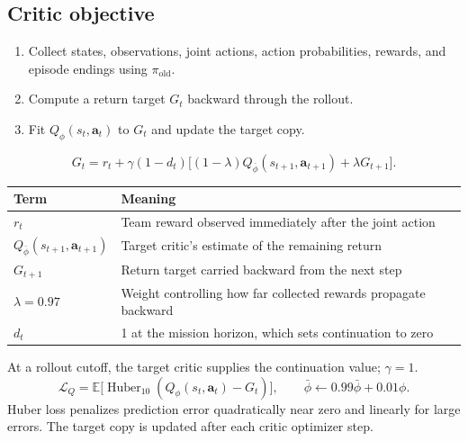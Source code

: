\documentclass[11pt,a4paper]{article}
\newcommand{\E}{\mathbb E}
\begin{document}
\subsection{Critic objective}
\begin{enumerate}
\item Collect states, observations, joint actions, action probabilities, rewards, and episode endings using $\pi_{\mathrm{old}}$.
\item Compute a return target $G_t$ backward through the rollout.
\item Fit $Q_\phi(s_t,\boldsymbol a_t)$ to $G_t$ and update the target copy.
\end{enumerate}
\[
G_t=r_t+\gamma(1-d_t)
\bigl[(1-\lambda)Q_{\bar\phi}(s_{t+1},\boldsymbol a_{t+1})+\lambda G_{t+1}\bigr].
\]
\begin{center}
\begin{tabularx}{\linewidth}{@{}lX@{}}
\toprule
Term & Meaning \\
\midrule
$r_t$ & Team reward observed immediately after the joint action \\
$Q_{\bar\phi}(s_{t+1},\boldsymbol a_{t+1})$ & Target critic's estimate of the remaining return \\
$G_{t+1}$ & Return target carried backward from the next step \\
$\lambda=0.97$ & Weight controlling how far collected rewards propagate backward \\
$d_t$ & 1 at the mission horizon, which sets continuation to zero \\
\bottomrule
\end{tabularx}
\end{center}
At a rollout cutoff, the target critic supplies the continuation value; $\gamma=1$.
\[
\mathcal L_Q=\E\bigl[\operatorname{Huber}_{10}(Q_\phi(s_t,\boldsymbol a_t)-G_t)\bigr],
\qquad \bar\phi\leftarrow0.99\bar\phi+0.01\phi.
\]
Huber loss penalizes prediction error quadratically near zero and linearly for large errors.
The target copy is updated after each critic optimizer step.
\end{document}
